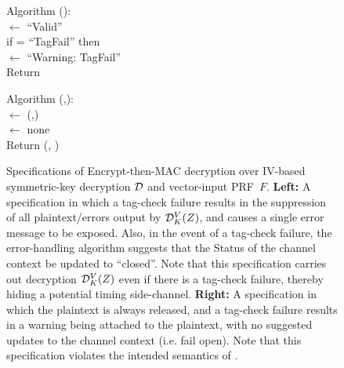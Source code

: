 \begin{figure}
{\medskip
Algorithm ():\\
\nudge {} $\gets$ ``Valid''\\
\nudge if  =  ``TagFail'' then\\ 
\nudge\nudge {} $\gets$ ``Warning: TagFail''\\
\nudge Return 

\medskip
Algorithm (,):\\
\nudge {} $\gets$ (,)\\
\nudge {} $\gets$ none \\
\nudge Return (, )
} 
\caption{Specifications of Encrypt-then-MAC decryption over IV-based
  symmetric-key decryption $\mathcal{D}$ and vector-input PRF~$F$.  {\bf
    Left:} A specification in which a tag-check failure results in the
suppression of all plaintext/errors output by $\mathcal{D}^V_K(Z)$, and
causes a single error message to be exposed.  Also,
in the event of a tag-check failure, the error-handling algorithm
suggests that the Status of the channel context be updated to
``closed''.  Note that this specification carries out decryption
$\mathcal{D}^V_K(Z)$ even if there is a tag-check failure, thereby hiding a
potential timing side-channel. 
%
{\bf
  Right: } A specification in which the plaintext is always released,
and a tag-check failure results in a warning being attached to the
plaintext, with no suggested updates to the channel context
(i.e. fail open).  Note that this specification violates the intended
semantics of .}
\label{fig:EtM-aead}
\end{figure}
